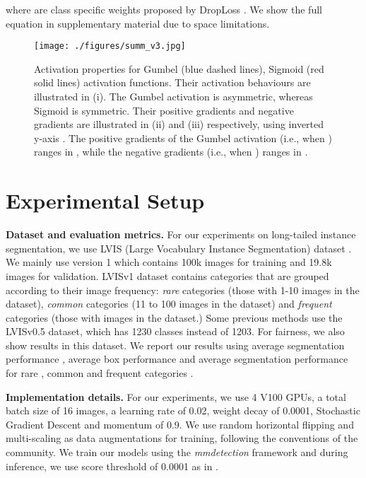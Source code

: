 \documentclass[runningheads]{llncs}
\begin{document}
where  are class specific weights proposed by DropLoss \cite{hsieh2021droploss}. We show the full equation in supplementary material due to space limitations.









\begin{figure}
    \texttt{[image: ./figures/summ\_v3.jpg]}
    \caption{Activation properties for Gumbel (blue dashed lines), Sigmoid (red solid lines) activation functions. Their activation behaviours are illustrated in (i). The Gumbel activation is asymmetric, whereas Sigmoid is symmetric. Their positive gradients and negative gradients are illustrated in (ii) and (iii) respectively, using inverted y-axis . The positive gradients of the Gumbel activation (i.e.,  when ) ranges in , while the negative gradients (i.e.,  when ) ranges in .}
    \label{fig:activation_summary_figures}
\end{figure}

\section{Experimental Setup}
\label{sec:experimental_setup}

\noindent\textbf{Dataset and evaluation metrics.}
For our experiments on long-tailed instance segmentation, we use LVIS (Large Vocabulary Instance Segmentation) dataset \cite{gupta2019lvis}. We mainly use version 1 which contains 100k images for training and 19.8k images for validation. LVISv1 dataset contains  categories that are grouped according to their image frequency: \textit{rare} categories (those with 1-10 images in the dataset), \textit{common} categories (11 to 100 images in the dataset) and \textit{frequent} categories (those with  images in the dataset.) Some previous methods use the LVISv0.5 dataset, which has 1230 classes instead of 1203.  For fairness, we also show results in this dataset. 
We report our results using average segmentation performance , average box performance  and average segmentation performance for rare , common  and frequent categories . 



\noindent\textbf{Implementation details.}
For our experiments, we use 4 V100 GPUs, a total batch size of 16 images, a learning rate of 0.02, weight decay of 0.0001, Stochastic Gradient Descent and momentum of 0.9. We use random horizontal flipping and multi-scaling as data augmentations for training, following the conventions of the community. We train our models using the \textit{mmdetection} framework \cite{mmdetection} and during inference, we use score threshold of 0.0001 as in \cite{gupta2019lvis}.
\end{document}
